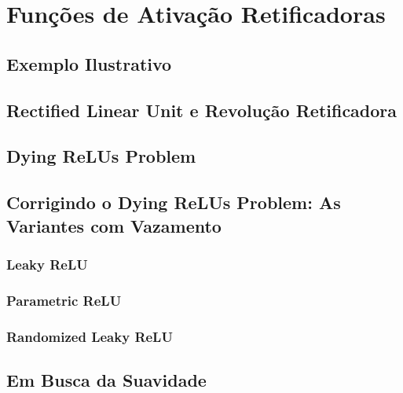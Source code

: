 
\chapter{Funções de Ativação Retificadoras}
\label{cap:ativacao-retificadoras}


\section{Exemplo Ilustrativo}


\section{Rectified Linear Unit e Revolução Retificadora}

\section{Dying ReLUs Problem}

\section{Corrigindo o Dying ReLUs Problem: As Variantes com Vazamento}

\subsection{Leaky ReLU}

\subsection{Parametric ReLU}

\subsection{Randomized Leaky ReLU}

\section{Em Busca da Suavidade}

